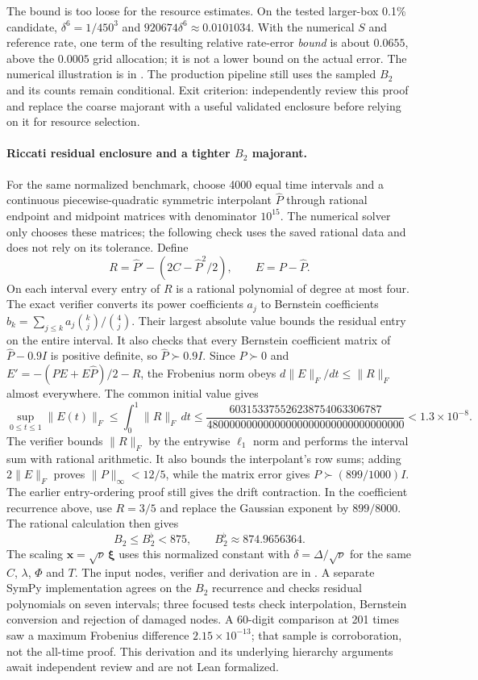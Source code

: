 \documentclass[11pt,a4paper]{article}
\newcommand{\x}{\mathbf x}
\begin{document}
The bound is too loose for the resource estimates. On the tested larger-box
0.1\% candidate, $\delta^6=1/450^3$ and $920674\delta^6\approx0.0101034$.
With the numerical $S$ and reference rate, one term of the resulting relative
rate-error \emph{bound} is about $0.0655$, above the $0.0005$ grid allocation;
it is not a lower bound on the actual error. The numerical illustration is in
. The production pipeline still
uses the sampled $B_2$ and its counts remain conditional. Exit criterion:
independently review this proof and replace the coarse majorant with a useful
validated enclosure before relying on it for resource selection.

\paragraph{Riccati residual enclosure and a tighter $B_2$ majorant.}
For the same normalized benchmark, choose 4000 equal time intervals and a
continuous piecewise-quadratic symmetric interpolant $\widehat P$ through
rational endpoint and midpoint matrices with denominator $10^{15}$. The
numerical solver only chooses these matrices; the following check uses the
saved rational data and does not rely on its tolerance. Define
\[
 R=\widehat P'-(2C-\widehat P^2/2),\qquad E=P-\widehat P.
\]
On each interval every entry of $R$ is a rational polynomial of degree at
most four. The exact verifier converts its power coefficients $a_j$ to
Bernstein coefficients
$b_k=\sum_{j\le k}a_j\binom{k}{j}/\binom{4}{j}$. Their largest absolute
value bounds the residual entry on the entire interval. It also checks that
every Bernstein coefficient matrix of $\widehat P-0.9I$ is positive
definite, so $\widehat P\succ0.9I$. Since $P\succ0$ and
$E'=-(PE+E\widehat P)/2-R$, the Frobenius norm obeys
$d\|E\|_F/dt\le\|R\|_F$ almost everywhere. The common initial value gives
\[
 \sup_{0\le t\le1}\|E(t)\|_F\le\int_0^1\|R\|_F\,dt
 \le\frac{603153375526238754063306787}
 {48000000000000000000000000000000000}<1.3\times10^{-8}.
\]
The verifier bounds $\|R\|_F$ by the entrywise $\ell_1$ norm and performs
the interval sum with rational arithmetic. It also bounds the interpolant's
row sums; adding $2\|E\|_F$ proves $\|P\|_\infty<12/5$, while the matrix
error gives $P\succ(899/1000)I$. The earlier entry-ordering proof still gives
the drift contraction. In the coefficient recurrence above, use $R=3/5$
and replace the Gaussian exponent by $899/8000$. The rational calculation
then gives
\[
 B_2\le B_2^{\flat}<875,\qquad B_2^{\flat}\approx874.9656364.
\]
The scaling $\x=\sqrt\nu\,\boldsymbol\xi$ uses this normalized constant
with $\delta=\Delta/\sqrt\nu$ for the same $C$, $\lambda$, $\Phi$ and $T$.
The input nodes, verifier and derivation are in .
A separate SymPy
implementation agrees on the $B_2$ recurrence and checks residual
polynomials on seven intervals; three focused tests check interpolation,
Bernstein conversion and rejection of damaged nodes. A 60-digit comparison
at 201 times saw a maximum Frobenius difference $2.15\times10^{-13}$; that
sample is corroboration, not the all-time proof. This derivation and its
underlying hierarchy arguments await independent review and are not Lean
formalized.
\end{document}
